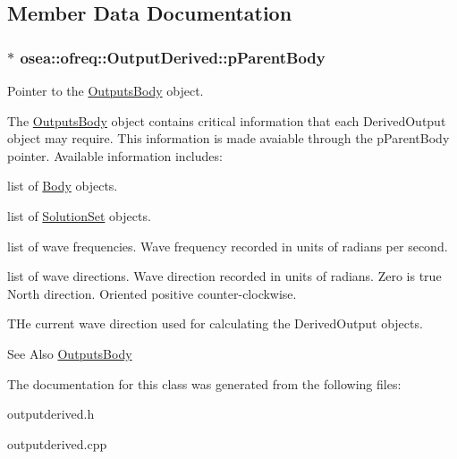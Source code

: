 \subsection{Member Data Documentation}
\hypertarget{classosea_1_1ofreq_1_1_output_derived_a62d01bedaed33feb53c4108eaf8e4baf}{
\subsubsection[{p\-Parent\-Body}]{$\ast$ osea\-::ofreq\-::\-Output\-Derived\-::p\-Parent\-Body\hspace{0.3cm}{\ttfamily [protected]}}}\label{classosea_1_1ofreq_1_1_output_derived_a62d01bedaed33feb53c4108eaf8e4baf}


Pointer to the \hyperlink{classosea_1_1ofreq_1_1_outputs_body}{Outputs\-Body} object. 

The \hyperlink{classosea_1_1ofreq_1_1_outputs_body}{Outputs\-Body} object contains critical information that each Derived\-Output object may require. This information is made avaiable through the p\-Parent\-Body pointer. Available information includes\-:
\begin{DoxyItemize}
\item list of \hyperlink{classosea_1_1ofreq_1_1_body}{Body} objects.
\item list of \hyperlink{classosea_1_1ofreq_1_1_solution_set}{Solution\-Set} objects.
\item list of wave frequencies. Wave frequency recorded in units of radians per second.
\item list of wave directions. Wave direction recorded in units of radians. Zero is true North direction. Oriented positive counter-\/clockwise.
\item T\-He current wave direction used for calculating the Derived\-Output objects.
\end{DoxyItemize}

\begin{DoxySeeAlso}{See Also}
\hyperlink{classosea_1_1ofreq_1_1_outputs_body}{Outputs\-Body} 
\end{DoxySeeAlso}


The documentation for this class was generated from the following files\-:\begin{DoxyCompactItemize}
\item 
outputderived.\-h\item 
outputderived.\-cpp\end{DoxyCompactItemize}
